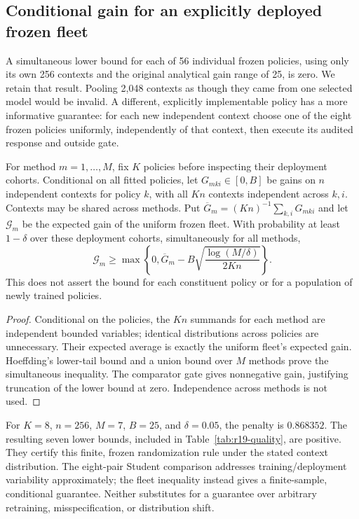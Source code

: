 \subsection{Conditional gain for an explicitly deployed frozen fleet}
A simultaneous lower bound for each of 56 individual frozen policies, using only its own 256 contexts and the original analytical gain range of 25, is zero. We retain that result. Pooling 2,048 contexts as though they came from one selected model would be invalid. A different, explicitly implementable policy has a more informative guarantee: for each new independent context choose one of the eight frozen policies uniformly, independently of that context, then execute its audited response and outside gate.

\begin{proposition}\label{prop:r19-fleet}
For method $m=1,\ldots,M$, fix $K$ policies before inspecting their deployment cohorts. Conditional on all fitted policies, let $G_{mki}\in[0,B]$ be gains on $n$ independent contexts for policy $k$, with all $Kn$ contexts independent across $k,i$. Contexts may be shared across methods. Put $\overline G_m=(Kn)^{-1}\sum_{k,i}G_{mki}$ and let $\mathcal G_m$ be the expected gain of the uniform frozen fleet. With probability at least $1-\delta$ over these deployment cohorts, simultaneously for all methods,
\begin{equation}\label{eq:r19-fleet}
 \mathcal G_m\geq\max\left\{0,\overline G_m-
 B\sqrt{\frac{\log(M/\delta)}{2Kn}}\right\}.
\end{equation}
This does not assert the bound for each constituent policy or for a population of newly trained policies.
\end{proposition}
\begin{proof}
Conditional on the policies, the $Kn$ summands for each method are independent bounded variables; identical distributions across policies are unnecessary. Their expected average is exactly the uniform fleet's expected gain. Hoeffding's lower-tail bound and a union bound over $M$ methods prove the simultaneous inequality. The comparator gate gives nonnegative gain, justifying truncation of the lower bound at zero. Independence across methods is not used.
\end{proof}
For $K=8$, $n=256$, $M=7$, $B=25$, and $\delta=0.05$, the penalty is $0.868352$. The resulting seven lower bounds, included in Table~\ref{tab:r19-quality}, are positive. They certify this finite, frozen randomization rule under the stated context distribution. The eight-pair Student comparison addresses training/deployment variability approximately; the fleet inequality instead gives a finite-sample, conditional guarantee. Neither substitutes for a guarantee over arbitrary retraining, misspecification, or distribution shift.

